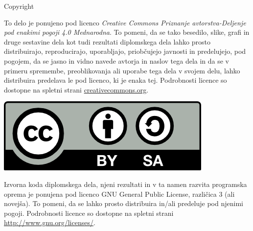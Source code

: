 
{\sc Copyright}




{\small \noindent
To delo je ponujeno pod licenco
\textit{Creative Commons Priznanje avtorstva-Deljenje pod enakimi pogoji 4.0 Mednarodna}.
To pomeni, da se tako besedilo, slike, grafi in druge sestavine dela kot tudi rezultati
diplomskega dela lahko prosto distribuirajo, reproducirajo, uporabljajo, priobčujejo javnosti
in predelujejo, pod pogojem, da se jasno in vidno navede avtorja in naslov tega dela in da se v
primeru spremembe, preoblikovanja ali uporabe tega dela v svojem delu, lahko distribuira
predelava le pod licenco, ki je enaka tej.
Podrobnosti licence so dostopne na spletni strani
\href{https://creativecommons.org/licenses/by-sa/4.0/deed.sl}{creativecommons.org}.
}

\vspace*{1cm}
\begin{center}
    \includegraphics{resources/copyright/cc-by-sa.png}
\end{center}

\vspace*{1cm}
{\small \noindent
    Izvorna koda diplomskega dela, njeni rezultati in v ta namen razvita programska oprema je
    ponujena pod licenco GNU General Public License, različica 3 (ali novejša).
    To pomeni, da se lahko prosto distribuira in/ali predeluje pod njenimi pogoji.
    Podrobnosti licence so dostopne na spletni strani \url{http://www.gnu.org/licenses/}.
}
